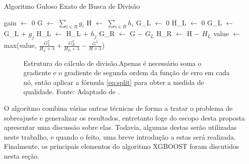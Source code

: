 \begin{algorithm}
\caption{Algoritmo Guloso Exato de Busca de Divisão}\label{al:greedyfind}
\begin{algorithmic}[1]

\State gain $\gets$ 0
\State G $\gets$ $\sum_{i\in R}g_i$
\State H $\gets$ $\sum_{i\in R}h_i$
    \State G\_L $\gets$ 0
    \State H\_L $\gets$ 0
        \State G\_L $\gets$ G\_L $+$ $g_j$
        \State H\_L $\gets$ H\_L $+$ $h_j$
        \State G\_R $\gets$ G $-$ $G_L$
        \State H\_R $\gets$ H $-$ $H_L$
        \State value $\gets$ max(value, $\frac{G_L^2}{H_L+\lambda}+\frac{G_R^2}{H_R+\lambda}-\frac{G^2}{H+\lambda}$)
    \EndFor
\EndFor
\end{algorithmic}
\end{algorithm}

\begin{figure}[H]
\centering
{}
\caption{Estrutura do cálculo de divisão.Apenas é necessário soma o gradiente e o gradiente de segunda ordem da função de erro em cada nó, então aplicar a fórmula \eqref{eq:split} para obter a medida de qualidade. Fonte: Adaptado de \cite{CHEN:2016}.}
\label{fig:structscore}
\end{figure}

O algoritmo combina várias outras técnicas de forma a tratar o problema de sobreajuste e generalizar os resultados, entretanto foge do escopo desta proposta apresentar uma discussão sobre elas. Todavia, algumas destas serão utilizadas neste trabalho, e quando o feito, uma breve introdução a estas será realizada. Finalmente, os principais elementos do algoritmo XGBOOST foram discutidos nesta seção.














